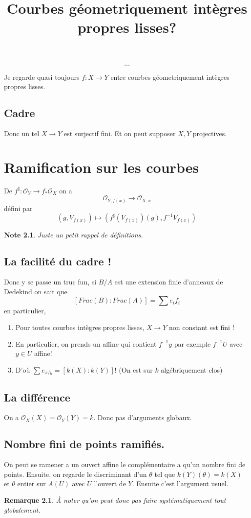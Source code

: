 \documentclass[a4paper,12pt]{book}
\title{Courbes géometriquement intègres propres lisses?}
\date{}
\newcommand{\Or}{\mathcal{O}}
\theoremstyle{plain}
\newtheorem{rem}{Remarque}
\newtheorem{note}{Note}
\theoremstyle{definition}
\theoremstyle{remark}
\begin{document}
\maketitle
\tableofcontents
\[\ldots\]   

Je regarde quasi toujours $f\colon X\to Y$ entre courbes 
géometriquement intègres propres lisses. 

\section{Cadre}
Donc un tel $X\to Y$ est surjectif fini. Et on peut supposer
$X,Y$ projectives.

\chapter{Ramification sur les courbes}
De $f^\sharp\colon \Or_Y\to f_*\Or_X$ on a
\[\Or_{Y,f(x)}\to \Or_{X,x}\]
défini par 
\[(g,V_{f(x)})\mapsto (f^\sharp(V_{f(x)})(g), f^{-1}V_{f(x)})\]
\begin{note}
  Juste un petit rappel de définitions.
\end{note}
\section{La facilité du cadre !}
Donc y se passe un truc fun, si $B/A$ est une extension finie
d'anneaux de Dedekind on sait que 
\[[Frac(B):Frac(A)]=\sum e_if_i\]
en particulier,
\begin{enumerate}
  \item Pour toutes courbes intègres propres lisses,
    $X\to Y$ non constant est fini ! 
  \item En particulier, on prends un affine qui contient $f^{-1}y$
    par exemple $f^{-1}U$ avec $y\in U$ affine! 
  \item D'où $\sum e_{x/y}=[k(X):k(Y)]$! (On est sur $k$ 
    algébriquement clos)
\end{enumerate}

\section{La différence}
On a $\Or_X(X)=\Or_Y(Y)=k$. Donc pas d'arguments globaux.

\section{Nombre fini de points ramifiés.}
On peut se ramener a un ouvert affine le complémentaire a qu'un
nombre fini de points. Ensuite, on regarde le discriminant d'un
$\theta$ tel que $k(Y)(\theta)=k(X)$ et $\theta$ entier sur 
$A(U)$ avec $U$ l'ouvert de $Y$. Ensuite c'est l'argument usuel.

\begin{rem}
  À noter qu'on peut donc pas faire systématiquement tout 
  globalement.
\end{rem}


\printbibliography
\end{document}
